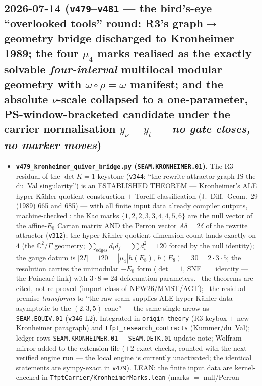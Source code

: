 \subsection*{2026-07-14 (\texttt{v479}--\texttt{v481} --- the bird's-eye ``overlooked tools'' round: R3's graph$\to$geometry bridge discharged to Kronheimer 1989; the four $\mu_4$ marks realised as the exactly solvable \emph{four-interval} multilocal modular geometry with $\omega\circ\rho=\omega$ manifest; and the absolute $\nu$-scale collapsed to a one-parameter, PS-window-bracketed candidate under the carrier normalisation $y_\nu{=}y_t$ --- \emph{no gate closes, no marker moves})}
\begin{itemize}[leftmargin=1.5em]
\item \textbf{\texttt{v479\_kronheimer\_quiver\_bridge.py} (\texttt{SEAM.KRONHEIMER.01}).} The R3 residual
of the $\det K{=}1$ keystone (\texttt{v344}: ``the rewrite attractor graph IS the du~Val singularity'') is
an ESTABLISHED THEOREM --- Kronheimer's ALE hyper-K\"ahler quotient construction $+$ Torelli classification
(J.~Diff.~Geom.~29 (1989) 665 and 685) --- with all finite input data already compiler outputs, machine-checked
\mE: the Kac marks $\{1,2,2,3,3,4,4,5,6\}$ are the null vector of the affine-$E_8$ Cartan matrix AND the
Perron vector $A\delta{=}2\delta$ of the rewrite attractor (\texttt{v312}); the hyper-K\"ahler quotient
dimension count lands exactly on $4$ (the $\mathbb{C}^2/\Gamma$ geometry;
$\sum_{\mathrm{edges}}d_id_j{=}\sum d_i^2{=}120$ forced by the null identity); the gauge datum is
$|2I|{=}120{=}|\mu_4|h(E_8)$, $h(E_8){=}30{=}2\cdot3\cdot5$; the resolution carries the unimodular $-E_8$
form ($\det{=}1$, SNF $=$ identity --- the Poincar\'e link) with $3\cdot8{=}24$ deformation parameters. \mC\
the theorems are cited, not re-proved (import class of NPW26/MMST/AGT); \mO\ the residual premise
\emph{transforms} to ``the raw seam supplies ALE hyper-K\"ahler data asymptotic to the $(2,3,5)$ cone'' ---
the same single arrow as \texttt{SEAM.EQUIV.01} (\texttt{v346} L2). Integrated in \texttt{origin\_theory}
(R3 keybox $+$ new Kronheimer paragraph) and \texttt{tfpt\_research\_contracts} (Kummer/du~Val); ledger rows
\texttt{SEAM.KRONHEIMER.01} $+$ \texttt{SEAM.DETK.01} update note; Wolfram mirror added to the
extension file ($+2$ exact checks, counted with the next verified engine run --- the local engine is
currently unactivated; the identical statements are sympy-exact in \texttt{v479}). LEAN: the finite
input data are kernel-checked in \texttt{TfptCarrier/KronheimerMarks.lean} (marks $=$ null/Perron

\end{itemize}
